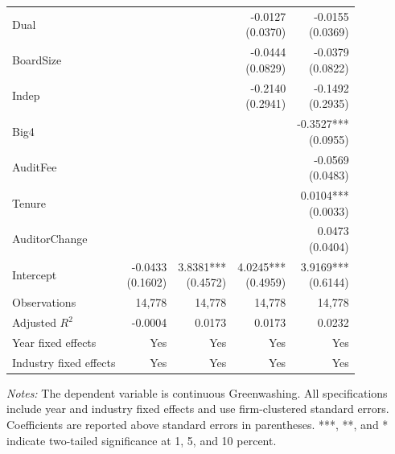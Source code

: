 \begin{table}[htbp]
{\begin{tabular}{lrrrr}
Dual &  &  & \shortstack{-0.0127 \\ (0.0370)} & \shortstack{-0.0155 \\ (0.0369)}\\[8pt]
BoardSize &  &  & \shortstack{-0.0444 \\ (0.0829)} & \shortstack{-0.0379 \\ (0.0822)}\\[8pt]
Indep &  &  & \shortstack{-0.2140 \\ (0.2941)} & \shortstack{-0.1492 \\ (0.2935)}\\[8pt]
Big4 &  &  &  & \shortstack{-0.3527*** \\ (0.0955)}\\[8pt]
AuditFee &  &  &  & \shortstack{-0.0569 \\ (0.0483)}\\[8pt]
Tenure &  &  &  & \shortstack{0.0104*** \\ (0.0033)}\\[8pt]
AuditorChange &  &  &  & \shortstack{0.0473 \\ (0.0404)}\\[8pt]
Intercept & \shortstack{-0.0433 \\ (0.1602)} & \shortstack{3.8381*** \\ (0.4572)} & \shortstack{4.0245*** \\ (0.4959)} & \shortstack{3.9169*** \\ (0.6144)}\\[8pt]
Observations & 14,778 & 14,778 & 14,778 & 14,778\\
Adjusted \(R^2\) & -0.0004 & 0.0173 & 0.0173 & 0.0232\\
Year fixed effects & Yes & Yes & Yes & Yes\\
Industry fixed effects & Yes & Yes & Yes & Yes\\
\hline\end{tabular}}
\begin{minipage}{0.98\textwidth}\footnotesize\textit{Notes:} The dependent variable is continuous Greenwashing. All specifications include year and industry fixed effects and use firm-clustered standard errors. Coefficients are reported above standard errors in parentheses. ***, **, and * indicate two-tailed significance at 1, 5, and 10 percent.\end{minipage}
\end{table}